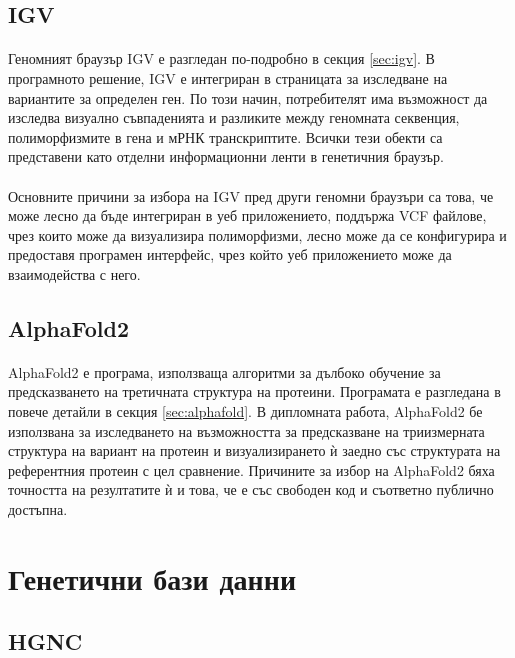 \documentclass[pdftex,cyrillic,14pt,a4page,twoside,openright]{extreport}
\begin{document}
\subsection{IGV}
\paragraph{}
Геномният браузър IGV е разгледан по-подробно в секция \ref{sec:igv}. В програмното решение, IGV е интегриран в страницата за изследване на вариантите за определен ген. По този начин, потребителят има възможност да изследва визуално съвпаденията и разликите между геномната секвенция, полиморфизмите в гена и мРНК транскриптите. Всички тези обекти са представени като отделни информационни ленти в генетичния браузър.

\paragraph{}
Основните причини за избора на IGV пред други геномни браузъри са това, че може лесно да бъде интегриран в уеб приложението, поддържа VCF файлове, чрез които може да визуализира полиморфизми, лесно може да се конфигурира и предоставя програмен интерфейс, чрез който уеб приложението може да взаимодейства с него.

\subsection{AlphaFold2}
\paragraph{}
AlphaFold2 е програма, използваща алгоритми за дълбоко обучение за предсказването на третичната структура на протеини. Програмата е разгледана в повече детайли в секция \ref{sec:alphafold}. В дипломната работа, AlphaFold2 бе използвана за изследването на възможността за предсказване на триизмерната структура на вариант на протеин и визуализирането ѝ заедно със структурата на референтния протеин с цел сравнение. Причините за избор на AlphaFold2 бяха точността на резултатите ѝ и това, че е със свободен код и съответно публично достъпна.

\section{Генетични бази данни}

\subsection{HGNC}\label{sec:hgnc}
\end{document}

